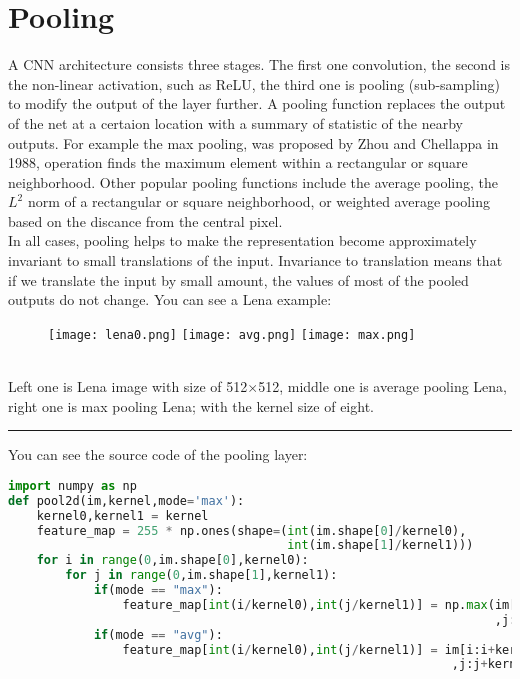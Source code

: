 \documentclass[11pt]{article}
\begin{document}
\section{Pooling}
\hspace*{1cm} A CNN architecture consists three stages. The first one convolution, the second is the non-linear activation, such as ReLU, the third one is pooling (sub-sampling) to modify the output of the layer further. A pooling function replaces the output of the net at a certaion location with a summary of statistic of the nearby outputs. For example the max pooling, was proposed by Zhou and Chellappa in 1988, operation finds the maximum element within a rectangular or square neighborhood. Other popular pooling functions include the average pooling, the $L^2$ norm of a rectangular or square neighborhood, or weighted average pooling based on the discance from the central pixel.\cite{GoodBengCour16}\\
In all cases, pooling helps to make the representation become approximately invariant to small translations of the input. Invariance to translation means that if we translate the input by small amount, the values of most of the pooled outputs do not change. You can see a Lena example:
\begin{figure}[htp]

\centering
\texttt{[image: lena0.png]}\hfill
\texttt{[image: avg.png]}\hfill
\texttt{[image: max.png]}

\caption{}
\label{fig:x}
\end{figure}\\
Left one is Lena image with size of 512$\times$512, middle one is average pooling Lena, right one is max pooling Lena; with the kernel size of eight.
\\
\par\noindent\rule{\textwidth}{0.5pt}
You can see the source code of the pooling layer:\\
\begin{lstlisting}[language=Python,basicstyle=\tiny]
import numpy as np
def pool2d(im,kernel,mode='max'):
    kernel0,kernel1 = kernel
    feature_map = 255 * np.ones(shape=(int(im.shape[0]/kernel0),
                                       int(im.shape[1]/kernel1)))
    for i in range(0,im.shape[0],kernel0):
        for j in range(0,im.shape[1],kernel1):
            if(mode == "max"):
                feature_map[int(i/kernel0),int(j/kernel1)] = np.max(im[i:i+kernel0
                                                                    ,j:j+kernel1])
            if(mode == "avg"):
                feature_map[int(i/kernel0),int(j/kernel1)] = im[i:i+kernel0
                                                              ,j:j+kernel1].mean()
\end{lstlisting}
\end{document}
